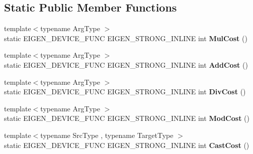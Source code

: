 \subsection*{Static Public Member Functions}
\begin{DoxyCompactItemize}
\item 
\mbox{\label{class_eigen_1_1_tensor_op_cost_a6beccb61485f429ac575d0a22abf9014}} 
{\footnotesize template$<$typename Arg\+Type $>$ }\\static E\+I\+G\+E\+N\+\_\+\+D\+E\+V\+I\+C\+E\+\_\+\+F\+U\+NC E\+I\+G\+E\+N\+\_\+\+S\+T\+R\+O\+N\+G\+\_\+\+I\+N\+L\+I\+NE int {\bfseries Mul\+Cost} ()
\item 
\mbox{\label{class_eigen_1_1_tensor_op_cost_a7c74e94f5c5992ddd756ba868df98441}} 
{\footnotesize template$<$typename Arg\+Type $>$ }\\static E\+I\+G\+E\+N\+\_\+\+D\+E\+V\+I\+C\+E\+\_\+\+F\+U\+NC E\+I\+G\+E\+N\+\_\+\+S\+T\+R\+O\+N\+G\+\_\+\+I\+N\+L\+I\+NE int {\bfseries Add\+Cost} ()
\item 
\mbox{\label{class_eigen_1_1_tensor_op_cost_ab5da69fab8e443d48fafa9880aa8691c}} 
{\footnotesize template$<$typename Arg\+Type $>$ }\\static E\+I\+G\+E\+N\+\_\+\+D\+E\+V\+I\+C\+E\+\_\+\+F\+U\+NC E\+I\+G\+E\+N\+\_\+\+S\+T\+R\+O\+N\+G\+\_\+\+I\+N\+L\+I\+NE int {\bfseries Div\+Cost} ()
\item 
\mbox{\label{class_eigen_1_1_tensor_op_cost_a7041e9d0ec3d9b67f951a6bfb68c3cc0}} 
{\footnotesize template$<$typename Arg\+Type $>$ }\\static E\+I\+G\+E\+N\+\_\+\+D\+E\+V\+I\+C\+E\+\_\+\+F\+U\+NC E\+I\+G\+E\+N\+\_\+\+S\+T\+R\+O\+N\+G\+\_\+\+I\+N\+L\+I\+NE int {\bfseries Mod\+Cost} ()
\item 
\mbox{\label{class_eigen_1_1_tensor_op_cost_a8087678093f5133cd7d001e8e4ae5899}} 
{\footnotesize template$<$typename Src\+Type , typename Target\+Type $>$ }\\static E\+I\+G\+E\+N\+\_\+\+D\+E\+V\+I\+C\+E\+\_\+\+F\+U\+NC E\+I\+G\+E\+N\+\_\+\+S\+T\+R\+O\+N\+G\+\_\+\+I\+N\+L\+I\+NE int {\bfseries Cast\+Cost} ()
\item 
\mbox{\label{class_eigen_1_1_tensor_op_cost_a6beccb61485f429ac575d0a22abf9014}} 

\end{DoxyCompactItemize}
